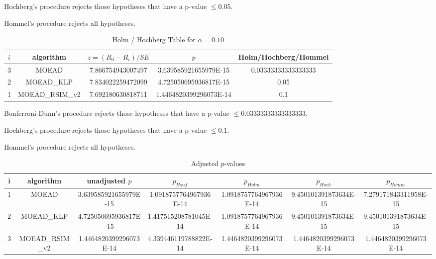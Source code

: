 \documentclass[a4paper,10pt]{article}
\begin{document}
\begin{landscape}
Hochberg's procedure rejects those hypotheses that have a p-value $\le0.05$.


Hommel's procedure rejects all hypotheses.


\begin{table}[!htp]
\centering\tiny
\caption{Holm / Hochberg Table for $\alpha=0.10$}
\begin{tabular}{ccccc}
$i$&algorithm&$z=(R_0 - R_i)/SE$&$p$&Holm/Hochberg/Hommel\\
\hline
3&MOEAD&7.866754943007497&3.639585921655979E-15&0.03333333333333333\\
2&MOEAD_KLP&7.834022259472099&4.725050695936817E-15&0.05\\
1&MOEAD_RSIM_v2&7.692180630818711&1.4464820399296073E-14&0.1\\
\hline
\end{tabular}
\end{table}
Bonferroni-Dunn's procedure rejects those hypotheses that have a p-value $\le0.03333333333333333$.


Hochberg's procedure rejects those hypotheses that have a p-value $\le0.1$.


Hommel's procedure rejects all hypotheses.


\begin{table}[!htp]
\centering\tiny
\caption{Adjusted $p$-values}
\begin{tabular}{ccccccc}
i&algorithm&unadjusted $p$&$p_{Bonf}$&$p_{Holm}$&$p_{Hoch}$&$p_{Homm}$\\
\hline
1&MOEAD&3.639585921655979E-15&1.0918757764967936E-14&1.0918757764967936E-14&9.450101391873634E-15&7.279171843311958E-15\\
2&MOEAD_KLP&4.725050695936817E-15&1.417515208781045E-14&1.0918757764967936E-14&9.450101391873634E-15&9.450101391873634E-15\\
3&MOEAD_RSIM_v2&1.4464820399296073E-14&4.339446119788822E-14&1.4464820399296073E-14&1.4464820399296073E-14&1.4464820399296073E-14\\
\hline
\end{tabular}
\end{table}


\end{landscape}
\end{document}
